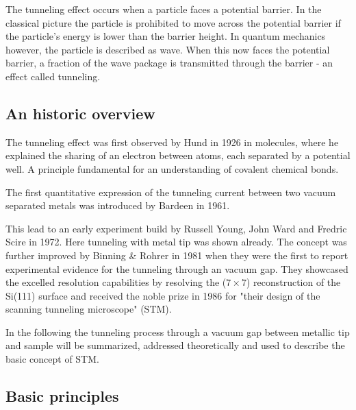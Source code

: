 The tunneling effect occurs when a particle faces a potential barrier. In the classical picture the particle is prohibited to move across the potential barrier if the particle's energy is lower than the barrier height. In quantum mechanics however, the particle is described as wave. When this now faces the potential barrier, a fraction of the wave package is transmitted through the barrier - an effect called tunneling.

\subsection{An historic overview}
The tunneling effect was first observed by Hund in 1926 in molecules, where he explained the sharing of an electron between atoms, each separated by a potential well.\cite{Mehra_tunneling_1982} A principle fundamental for an understanding of covalent chemical bonds. 

The first quantitative expression of the tunneling current between two vacuum separated metals was introduced by Bardeen in 1961.\cite{Bardeen_tunneling_1961} 

This lead to an early experiment build by Russell Young, John Ward and Fredric Scire in 1972.\cite{Young_topographiner_1972} Here tunneling with metal tip was shown already. The concept was further improved by Binning \& Rohrer in 1981 when they were the first to report experimental evidence for the tunneling through an vacuum gap.\cite{binning_tunneling_1982} They showcased the excelled resolution capabilities by resolving the ($7 \times 7$) reconstruction of the Si(111) surface \cite{binnig_1983} and received the noble prize in 1986 for "their design of the scanning tunneling microscope" (STM).\cite{_noble_price_1986} 

In the following the tunneling process through a vacuum gap between metallic tip and sample will be summarized, addressed theoretically and used to describe the basic concept of STM.

\subsection{Basic principles}

